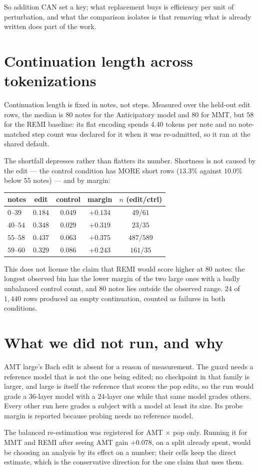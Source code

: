 \documentclass{article}
\begin{document}
So addition CAN set a key; what replacement buys is efficiency per unit of
perturbation, and what the comparison isolates is that removing what is already written
does part of the work.

\section{Continuation length across tokenizations}

Continuation length is fixed in notes, not steps. Measured over the held-out edit rows,
the median is $80$ notes for the Anticipatory model and $80$ for MMT, but $58$ for the
REMI baseline: its flat encoding spends $4.40$ tokens per note and no note-matched step
count was declared for it when it was re-admitted, so it ran at the shared default.

The shortfall depresses rather than flatters its number. Shortness is not caused by the
edit --- the control condition has MORE short rows ($13.3\%$ against $10.0\%$ below
$55$ notes) --- and by margin:

\begin{center}\footnotesize
\begin{tabular}{@{}lcccc@{}}
\toprule
notes & edit & control & margin & $n$ (edit/ctrl)\\
\midrule
$0$--$39$  & $0.184$ & $0.049$ & $+0.134$ & $49/61$\\
$40$--$54$ & $0.348$ & $0.029$ & $+0.319$ & $23/35$\\
$55$--$58$ & $0.437$ & $0.063$ & $+0.375$ & $487/589$\\
$59$--$60$ & $0.329$ & $0.086$ & $+0.243$ & $161/35$\\
\bottomrule
\end{tabular}
\end{center}

This does not license the claim that REMI would score higher at $80$ notes: the longest
observed bin has the lower margin of the two large ones with a badly unbalanced control
count, and $80$ notes lies outside the observed range. $24$ of $1{,}440$ rows produced
an empty continuation, counted as failures in both conditions.

\section{What we did not run, and why}

AMT large's Bach edit is absent for a reason of measurement. The guard needs a
reference model that is not the one being edited; no checkpoint in that family is
larger, and large is itself the reference that scores the pop edits, so the run would
grade a $36$-layer model with a $24$-layer one while that same model grades others.
Every other run here grades a subject with a model at least its size. Its probe margin
is reported because probing needs no reference model.

The balanced re-estimation was registered for AMT $\times$ pop only. Running it for MMT
and REMI after seeing AMT gain $+0.078$, on a split already spent, would be choosing an
analysis by its effect on a number; their cells keep the direct estimate, which is the
conservative direction for the one claim that uses them.
\end{document}
